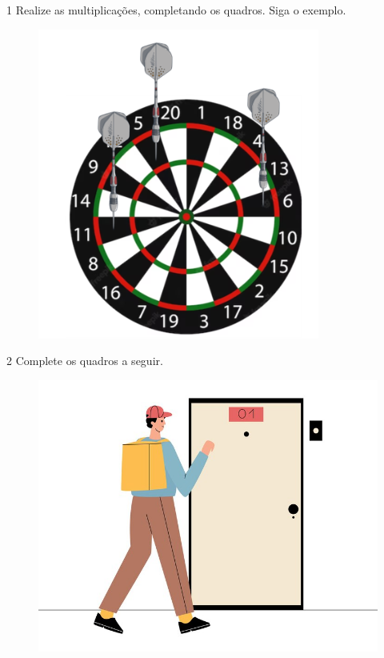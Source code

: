 
\num{1} Realize as multiplicações, completando os quadros. Siga o exemplo.

\begin{figure}[htpb!]
\includegraphics[width=\textwidth]{./media/image104.png}
\end{figure}

\pagebreak
\num{2} Complete os quadros a seguir.

\begin{figure}[htpb!]
\includegraphics[width=\textwidth]{./media/image105.png}
\end{figure}


